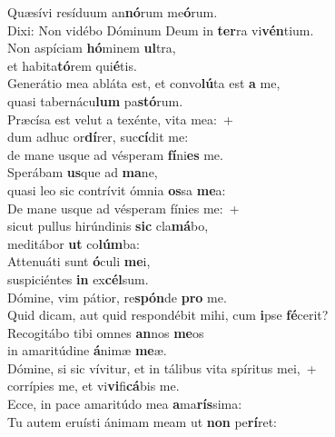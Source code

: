 \evenverse Quæsívi resíduum an\textbf{nó}rum me\textbf{ó}rum.~\*\\
\evenverse Dixi: Non vidébo Dóminum Deum in \textbf{ter}ra vi\textbf{vén}tium.\\
\oddverse Non aspíciam \textbf{hó}minem \textbf{ul}tra,~\*\\
\oddverse et habita\textbf{tó}rem qui\textbf{é}tis.\\
\evenverse Generátio mea abláta est, et convo\textbf{lú}ta est \textbf{a} me,~\*\\
\evenverse quasi tabernácu\textbf{lum} pa\textbf{stó}rum.\\
\oddverse Præcísa est velut a texénte, vita mea:~+\\
\oddverse  dum adhuc or\textbf{dí}rer, suc\textbf{cí}dit me:~\*\\
\oddverse de mane usque ad vésperam \textbf{fí}ni\textbf{es} me.\\
\evenverse Sperábam \textbf{us}que ad \textbf{ma}ne,~\*\\
\evenverse quasi leo sic contrívit ómnia \textbf{os}sa \textbf{me}a:\\
\oddverse De mane usque ad vésperam fínies me:~+\\
\oddverse  sicut pullus hirúndinis \textbf{sic} cla\textbf{má}bo,~\*\\
\oddverse meditábor \textbf{ut} co\textbf{lúm}ba:\\
\evenverse Attenuáti sunt \textbf{ó}culi \textbf{me}i,~\*\\
\evenverse suspiciéntes \textbf{in} ex\textbf{cél}sum.\\
\oddverse Dómine, vim pátior, re\textbf{spón}de \textbf{pro} me.~\*\\
\oddverse Quid dicam, aut quid respondébit mihi, cum \textbf{i}pse \textbf{fé}cerit?\\
\evenverse Recogitábo tibi omnes \textbf{an}nos \textbf{me}os~\*\\
\evenverse in amaritúdine \textbf{á}nimæ \textbf{me}æ.\\
\oddverse Dómine, si sic vívitur, et in tálibus vita spíritus mei,~+\\
\oddverse  corrípies me, et vi\textbf{vi}fi\textbf{cá}bis me.~\*\\
\oddverse Ecce, in pace amaritúdo mea \textbf{a}ma\textbf{rís}sima:\\
\evenverse Tu autem eruísti ánimam meam ut \textbf{non} pe\textbf{rí}ret:~\*\\
